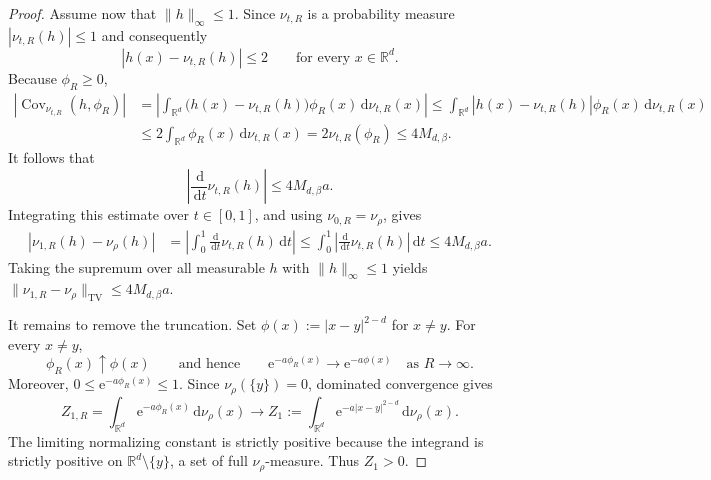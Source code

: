 \documentclass[10pt,a4paper]{amsart}
\newcommand{\R}{\mathbb R}
\newcommand{\TV}{\mathrm{TV}}
\newcommand{\be}{\beta}
\newcommand{\dd}{\,\mathrm d}
\newcommand{\ee}{\mathrm e}
\begin{document}
\begin{proof}
Assume now that \(\|h\|_\infty\le1\).  Since \(\nu_{t,R}\) is a
probability measure $|\nu_{t,R}(h)|\le1$
and consequently
\[
 |h(x)-\nu_{t,R}(h)|\le2
 \qquad\text{for every }x\in\R^d.
\]
Because \(\phi_R\ge0\),
\begin{align*}
 \left|
 \operatorname{Cov}_{\nu_{t,R}}(h,\phi_R)
 \right|
 &=
 \left|
 \int_{\R^d}
 \bigl(h(x)-\nu_{t,R}(h)\bigr)\phi_R(x)
 \dd\nu_{t,R}(x)
 \right|\le
 \int_{\R^d}
 |h(x)-\nu_{t,R}(h)|\phi_R(x)
 \dd\nu_{t,R}(x)\\
 &\le
 2\int_{\R^d}\phi_R(x)\dd\nu_{t,R}(x)=
 2\nu_{t,R}(\phi_R)\le4M_{d,\be}.
\end{align*}
It follows that
\[
 \left|
 \frac{\dd}{\dd t}\nu_{t,R}(h)
 \right|
 \le4M_{d,\be}a.
\]
Integrating this estimate over \(t\in[0,1]\), and using
\(\nu_{0,R}=\nu_\rho\), gives
\begin{align*}
 |\nu_{1,R}(h)-\nu_\rho(h)|
 &=
 \left|
 \int_0^1
 \frac{\dd}{\dd t}\nu_{t,R}(h)\dd t
 \right|\le
 \int_0^1
 \left|
 \frac{\dd}{\dd t}\nu_{t,R}(h)
 \right|\dd t \le4M_{d,\be}a.
\end{align*}
Taking the supremum over all measurable \(h\) with
\(\|h\|_\infty\le1\) yields $\|\nu_{1,R}-\nu_\rho\|_{\TV}
 \le4M_{d,\be}a.$

It remains to remove the truncation.  Set $\phi(x):=|x-y|^{2-d}$ for $x\ne y.$
For every \(x\ne y\),
\[
 \phi_R(x)\uparrow\phi(x)
 \qquad\text{and hence}\qquad
 \ee^{-a\phi_R(x)}\longrightarrow\ee^{-a\phi(x)}
 \quad\text{as }R\to\infty.
\]
Moreover, $0\le\ee^{-a\phi_R(x)}\le1.$
Since \(\nu_\rho(\{y\})=0\), dominated convergence gives
\[
 Z_{1,R}
 =
 \int_{\R^d}\ee^{-a\phi_R(x)}\dd\nu_\rho(x)
 \longrightarrow
 Z_1
 :=
 \int_{\R^d}\ee^{-a|x-y|^{2-d}}\dd\nu_\rho(x).
\]
The limiting normalizing constant is strictly positive because the
integrand is strictly positive on \(\R^d\setminus\{y\}\), a set of full
\(\nu_\rho\)-measure.  Thus \(Z_1>0\).


\end{proof}
\end{document}
